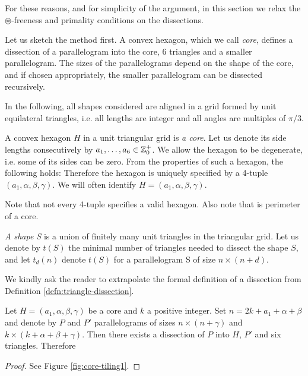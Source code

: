 For these reasons, and for simplicity of the argument, in this section we relax the $\circledast$-freeness and primality conditions on the dissections.

\bigskip

Let us sketch the method first. A convex hexagon, which we call \emph{core}, defines a dissection of a parallelogram into the core, 6 triangles and a smaller parallelogram. The sizes of the parallelograms depend on the shape of the core, and if chosen appropriately, the smaller parallelogram can be dissected recursively.

In the following, all shapes considered are aligned in a grid formed by unit equilateral triangles, i.e. all lengths are integer and all angles are multiples of $\pi/3$.

\begin{defn}
A convex hexagon $H$ in a unit triangular grid is \emph{a core}. Let us denote its side lengths consecutively by $a_1,\dots,a_6 \in \mathbb Z_0^+$. We allow the hexagon to be degenerate, i.e. some of its sides can be zero. From the properties of such a hexagon, the following holds:
Therefore the hexagon is uniquely specified by a 4-tuple $(a_1, \alpha, \beta, \gamma)$. We will often identify $H = (a_1, \alpha, \beta, \gamma)$.
\end{defn}

Note that not every 4-tuple specifies a valid hexagon. Also note that
%
is perimeter of a core.

\begin{defn}
\emph{A shape S} is a union of finitely many unit triangles in the triangular grid. Let us denote by $t(S)$ the minimal number of triangles needed to dissect the shape $S$, and let $t_d(n)$ denote $t(S)$ for a parallelogram S of size $n \times (n+d)$.
\end{defn}

We kindly ask the reader to extrapolate the formal definition of a dissection from Definition \ref{defn:triangle-dissection}.

\begin{lem}
\label{lem:core-tiling}
Let $H = (a_1, \alpha, \beta, \gamma)$ be a core and $k$ a positive integer. Set $n = 2k+a_1+\alpha+\beta$ and denote by $P$ and $P'$ parallelograms of sizes $n\times(n+\gamma)$ and $k\times(k+\alpha+\beta+\gamma)$. Then there exists a dissection of $P$ into $H$, $P'$ and six triangles. Therefore
\end{lem}
\begin{proof}
See Figure \ref{fig:core-tiling1}.
\end{proof}

